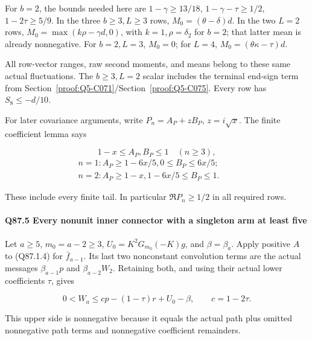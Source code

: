 For \(b=\allowbreak 2\), the bounds needed here are
\(1-\gamma\ge\allowbreak 13/18\), \(1-\gamma-\tau\ge\allowbreak 1/2\),
\(1-2\tau\ge\allowbreak 5/9\). In the three \(b\ge\allowbreak 3,\allowbreak  L\ge\allowbreak 3\) rows,
\(M_0=\allowbreak (\theta-\delta)d\). In the two \(L=\allowbreak 2\) rows,
\(M_0=\allowbreak \max(k\rho-\gamma d,\allowbreak  0)\), with \(k=\allowbreak 1,\allowbreak  \rho=\allowbreak \delta_2\) for
\(b=\allowbreak 2\); that latter mean is already nonnegative.
For \(b=\allowbreak 2,\allowbreak  L=\allowbreak 3\), \(M_0=\allowbreak 0\); for \(L=\allowbreak 4\),
\(M_0=\allowbreak (\theta\kappa-\tau)d\).

All row-vector ranges, raw second moments, and means belong to these
same actual fluctuations. The \(b\ge\allowbreak 3,\allowbreak  L=\allowbreak 2\) scalar includes the terminal end-sign term from Section~\ref{proof:Q5-C071}/Section~\ref{proof:Q5-C075}. Every row has \(S_8\le\allowbreak -d/10\).

For later covariance arguments, write
\(P_n=\allowbreak A_P+zB_P\), \(z=\allowbreak i\sqrt x\). The finite coefficient
lemma says

\[
 1-x\le A_P,B_P\le1\quad(n\ge3),
\]
\[
\begin{gathered}
n=1: A_P\ge1-6x/5, 0\le B_P\le6x/5;\qquad\\
n=2: A_P\ge1-x, 1-6x/5\le B_P\le1.
\end{gathered}\tag{Q87.4.4}\label{eq:Q87:4.4}
\]

These include every finite tail. In particular \(\Re P_n\ge\allowbreak 1/2\)
in all required rows.

\paragraph{Q87.5 Every nonunit inner connector with a singleton arm at least five}\label{part:Q87.5}

Let \(a\ge\allowbreak 5\), \(m_0=\allowbreak a-2\ge\allowbreak 3\), \(U_0=\allowbreak K^2G_{m_0}(-K)g\),
and \(\beta=\allowbreak \beta_a\). Apply positive \(A\) to (Q87.1.4) for
\(\bar f_{a-1}\). Its last two nonconstant convolution terms are the
actual messages \(\beta_{a-1}p\) and \(\beta_{a-2}W_2\).
Retaining both, and using their actual lower coefficients \(\tau\),
gives

\[
 0<W_a\le cp-(1-\tau)r+U_0-\beta,\qquad c=1-2\tau.
 \tag{Q87.5.1}\label{eq:Q87:5.1}
\]

This upper side is nonnegative because it equals the actual path
plus omitted nonnegative path terms and nonnegative coefficient
remainders. 

